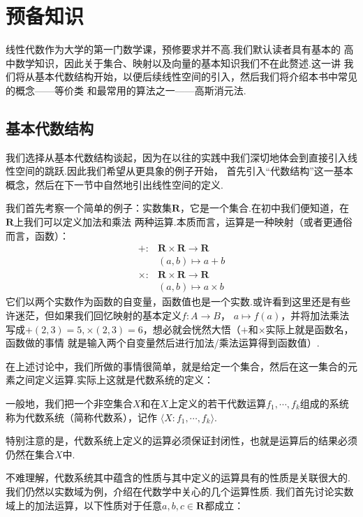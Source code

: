 \chapter{预备知识}

\indent 线性代数作为大学的第一门数学课，预修要求并不高.我们默认读者具有基本的
高中数学知识，因此关于集合、映射以及向量的基本知识我们不在此赘述.这一讲
我们将从基本代数结构开始，以便后续线性空间的引入，然后我们将介绍本书中常见的概念——等价类
和最常用的算法之一——高斯消元法.

\section{基本代数结构}
我们选择从基本代数结构谈起，因为在以往的实践中我们深切地体会到直接引入线性空间的跳跃.因此我们希望从更具象的例子开始，
首先引入“代数结构”这一基本概念，然后在下一节中自然地引出线性空间的定义.

我们首先考察一个简单的例子：实数集$\mathbf{R}$，它是一个集合.在初中我们便知道，在$\mathbf{R}$上我们可以定义加法和乘法
两种运算.本质而言，运算是一种映射（或者更通俗而言，函数）：
\begin{align*}
	+: & \mathbf{R}\times\mathbf{R}\to\mathbf{R}\\
	   & (a,b)\mapsto a+b\\
	\times: & \mathbf{R}\times\mathbf{R}\to\mathbf{R}\\
	   & (a,b)\mapsto a\times b
\end{align*}
它们以两个实数作为函数的自变量，函数值也是一个实数.或许看到这里还是有些许迷茫，但如果我们回忆映射的基本定义$f:A\to B$，
$a\mapsto f(a)$，并将加法乘法写成$+(2,3)=5,\times(2,3)=6$，想必就会恍然大悟（$+$和$\times$实际上就是函数名，函数做的事情
就是输入两个自变量然后进行加法/乘法运算得到函数值）.

在上述讨论中，我们所做的事情很简单，就是给定一个集合，然后在这一集合的元素之间定义运算.实际上这就是代数系统的定义：
\begin{definition}
	一般地，我们把一个非空集合$X$和在$X$上定义的若干代数运算$f_1,\cdots,f_k$组成的系统称为代数系统（简称代数系），记作
	$\langle X:f_1,\cdots,f_k\rangle$.
\end{definition}

特别注意的是，代数系统上定义的运算必须保证封闭性，也就是运算后的结果必须仍然在集合$X$中.

不难理解，代数系统其中蕴含的性质与其中定义的运算具有的性质是关联很大的.我们仍然以实数域为例，介绍在代数学中关心的几个运算性质.
我们首先讨论实数域上的加法运算，以下性质对于任意$a,b,c\in\mathbf{R}$都成立：
	

